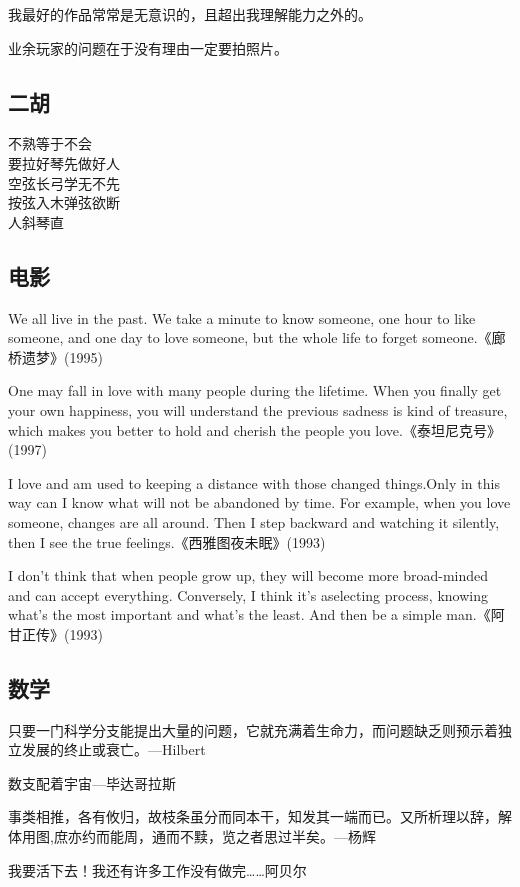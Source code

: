\documentclass{article}
\begin{document}
我最好的作品常常是无意识的，且超出我理解能力之外的。

业余玩家的问题在于没有理由一定要拍照片。

\subsection{二胡}
不熟等于不会\\
要拉好琴先做好人\\
空弦长弓学无不先\\
按弦入木弹弦欲断\\
人斜琴直\\

\subsection{电影}
We all live in the past. We take a minute to know someone, one hour to like someone, and one day to love someone, but the whole life to forget someone.《廊桥遗梦》(1995)

One may fall in love with many people during the lifetime. When you finally get your own happiness, you will understand the previous sadness is kind of treasure, which makes you better to hold and cherish the people you love.《泰坦尼克号》(1997)

I love and am used to keeping a distance with those changed things.Only in this way can I know what will not be abandoned by time. For example, when you love someone, changes are all around. Then I step backward and watching it silently, then I see the true feelings.《西雅图夜未眠》(1993)

I don't think that when people grow up, they will become more broad-minded and can accept everything. Conversely, I think it's aselecting process, knowing what's the most important and what's the least. And then be a simple man.《阿甘正传》(1993)

\subsection{数学}
只要一门科学分支能提出大量的问题，它就充满着生命力，而问题缺乏则预示着独立发展的终止或衰亡。---Hilbert

数支配着宇宙---毕达哥拉斯

事类相推，各有攸归，故枝条虽分而同本干，知发其一端而已。又所析理以辞，解体用图,庶亦约而能周，通而不黩，览之者思过半矣。---杨辉

我要活下去！我还有许多工作没有做完……阿贝尔
\end{document}
